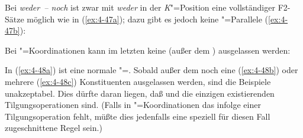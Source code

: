 \documentclass[output=paper]{langsci/langscibook}
\begin{document}
\begin{exe}
\ex
\label{ex:4-45}
\begin{xlist}

\end{xlist}
\ex
\label{ex:4-46}
\begin{xlist}

\end{xlist}
\end{exe}
Bei \textit{weder~-- noch} ist zwar mit \textit{weder} in der \textit{K}{}"=Position eine  vollständiger F2-Sätze möglich wie in (\ref{ex:4-47a}); dazu gibt es jedoch keine "=Parallele (\ref{ex:4-47b}):
\begin{exe}
\ex
\label{ex:4-47}
\begin{xlist}

\end{xlist}
\end{exe}

\ssubsection{}%
\label{subsec:4-3-3}
Bei "=Koordinationen kann im letzten  keine  (außer dem ) ausgelassen werden:

\begin{exe}
\ex
\label{ex:4-48}
\begin{xlist}


\end{xlist}
\end{exe}
In (\ref{ex:4-48a}) ist eine normale "=. Sobald außer dem  noch eine (\ref{ex:4-48b}) oder mehrere (\ref{ex:4-48c}) Konstituenten ausgelassen werden, sind die Beispiele unakzeptabel. Dies dürfte daran liegen, daß  und  die einzigen existierenden Tilgungsoperationen sind. (Falls in "=Koordinationen das  infolge einer Tilgungsoperation fehlt, müßte dies jedenfalls eine speziell für diesen Fall zugeschnittene Regel sein.)
\end{document}

